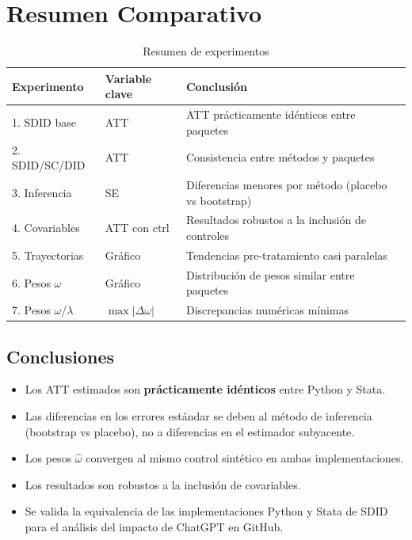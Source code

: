 \documentclass[12pt,a4paper]{article}
\begin{document}
\section{Resumen Comparativo}

\begin{table}[htbp]\centering
\caption{Resumen de experimentos}
\begin{tabular}{llp{7cm}}
\toprule
Experimento & Variable clave & Conclusi\'on \\
\midrule
1. SDID base & ATT & ATT pr\'acticamente id\'enticos entre paquetes \\
2. SDID/SC/DID & ATT & Consistencia entre m\'etodos y paquetes \\
3. Inferencia & SE & Diferencias menores por m\'etodo (placebo vs bootstrap) \\
4. Covariables & ATT con ctrl & Resultados robustos a la inclusi\'on de controles \\
5. Trayectorias & Gr\'afico & Tendencias pre-tratamiento casi paralelas \\
6. Pesos $\omega$ & Gr\'afico & Distribuci\'on de pesos similar entre paquetes \\
7. Pesos $\omega$/$\lambda$ & $\max|\Delta\omega|$ & Discrepancias num\'ericas m\'inimas \\
\bottomrule
\end{tabular}
\end{table}

\subsection*{Conclusiones}
\begin{itemize}
  \item Los ATT estimados son \textbf{pr\'acticamente id\'enticos} entre Python y Stata.
  \item Las diferencias en los errores est\'andar se deben al m\'etodo de inferencia
        (bootstrap vs placebo), no a diferencias en el estimador subyacente.
  \item Los pesos $\hat{\omega}$ convergen al mismo control sint\'etico en ambas implementaciones.
  \item Los resultados son robustos a la inclusi\'on de covariables.
  \item Se valida la equivalencia de las implementaciones Python y Stata de SDID
        para el an\'alisis del impacto de ChatGPT en GitHub.
\end{itemize}
\end{document}
